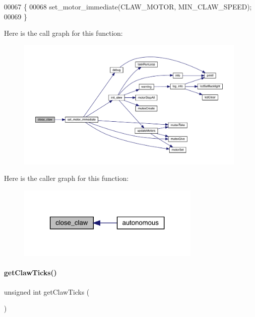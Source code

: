 \begin{DoxyCode}
00067                   \{
00068   set_motor_immediate(CLAW_MOTOR, MIN_CLAW_SPEED);
00069 \}
\end{DoxyCode}
Here is the call graph for this function\+:\nopagebreak
\begin{figure}[H]
\begin{center}
\leavevmode
\includegraphics[width=350pt]{claw_8c_ac42dd40dbb37219295286859c6b068c2_cgraph}
\end{center}
\end{figure}
Here is the caller graph for this function\+:\nopagebreak
\begin{figure}[H]
\begin{center}
\leavevmode
\includegraphics[width=252pt]{claw_8c_ac42dd40dbb37219295286859c6b068c2_icgraph}
\end{center}
\end{figure}
\mbox{\label{claw_8c_addd2004effae7c94400aed1fe6a90ead}} 
\paragraph{get\+Claw\+Ticks()}
{\footnotesize\ttfamily unsigned int get\+Claw\+Ticks (\begin{DoxyParamCaption}{ }\end{DoxyParamCaption})}



